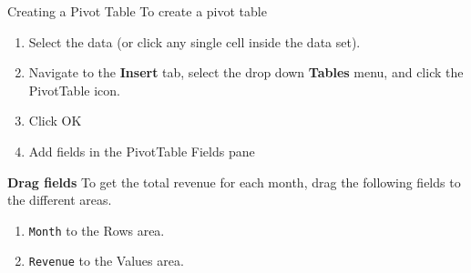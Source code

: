 \documentclass[xcolor=svgnames, handout]{beamer}
\begin{document}
\begin{frame}{Creating a Pivot Table}
To create a pivot table
\begin{enumerate}
\item Select the data (or click any single cell inside the data set).
\item  Navigate to the {\bf Insert} tab, select the drop down {\bf Tables} menu, and click the PivotTable icon. 
\item Click OK
\item Add fields in the PivotTable Fields pane
\end{enumerate}
{\bf Drag fields}
To get the total revenue for each month, drag the following fields to the different areas.
\begin{enumerate}
\item  {\tt Month} to the Rows area.
\item {\tt Revenue} to the  Values area.
\end{enumerate}
\end{frame}

\end{document}
